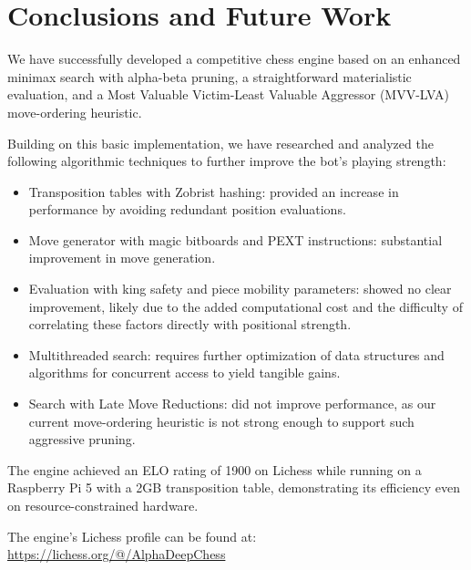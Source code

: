 \chapter{Conclusions and Future Work}

We have successfully developed a competitive chess engine based on an enhanced minimax search with alpha-beta pruning, a straightforward materialistic evaluation, and a Most Valuable Victim-Least Valuable Aggressor (MVV-LVA) move-ordering heuristic.

\vspace{1em}

\noindent Building on this basic implementation, we have researched and analyzed the following algorithmic techniques to further improve the bot's playing strength:

\begin{itemize}[itemsep=1pt]
    \item Transposition tables with Zobrist hashing: provided an increase in performance by avoiding redundant position evaluations.
    \item Move generator with magic bitboards and PEXT instructions: substantial improvement in move generation.
    
    \item Evaluation with king safety and piece mobility parameters: showed no clear improvement, likely due to the added computational cost and the difficulty of correlating these factors directly with positional strength.
    \item Multithreaded search: requires further optimization of data structures and algorithms for concurrent access to yield tangible gains.
    \item Search with Late Move Reductions: did not improve performance, as our current move-ordering heuristic is not strong enough to support such aggressive pruning.
\end{itemize}

\noindent The engine achieved an ELO rating of 1900 on Lichess while running on a Raspberry Pi 5 with a 2GB transposition table, demonstrating its efficiency even on resource-constrained hardware.

\vspace{1em}

\noindent The engine's Lichess profile can be found at:\\
\url{https://lichess.org/@/AlphaDeepChess}

\vspace{1em}

